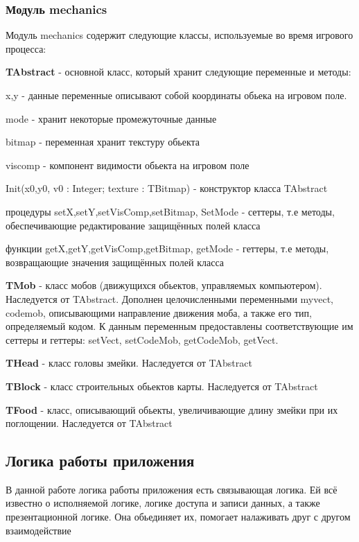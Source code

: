 \documentclass[a4paper,14pt]{extarticle}
\begin{document}
\subsubsection{Модуль mechanics}
Модуль mechanics содержит следующие классы, используемые во время игрового процесса:

\textbf{TAbstract} - основной класс, который хранит следующие переменные и методы:

 x,y - данные переменные описывают собой координаты обьека на игровом поле. 

 mode - хранит некоторые промежуточные данные

 bitmap - переменная хранит текстуру обьекта

 viscomp - компонент видимости обьекта на игровом поле

 Init(x0,y0, v0 : Integer; texture : TBitmap) - конструктор класса TAbstract

 процедуры setX,setY,setVisComp,setBitmap, SetMode - сеттеры, т.е методы, обеспечивающие редактирование защищённых полей класса

 функции getX,getY,getVisComp,getBitmap, getMode - геттеры, т.е методы, возвращающие значения защищённых полей класса

\textbf{TMob} - класс мобов (движущихся обьектов, управляемых компьютером). Наследуется от TAbstract. Дополнен целочисленными переменными myvect, codemob, описывающими направление движения моба, а также его тип, определяемый кодом. К данным переменным предоставлены соответствующие им сеттеры и геттеры: setVect, setCodeMob, getCodeMob, getVect.

\textbf{THead} - класс головы змейки. Наследуется от TAbstract

\textbf{TBlock} - класс строительных обьектов карты. Наследуется от TAbstract

\textbf{TFood} - класс, описывающий обьекты, увеличивающие длину змейки при их поглощении. Наследуется от TAbstract

\subsection{Логика работы приложения}
В данной работе логика работы приложения есть связывающая логика. Ей всё известно о исполняемой логике, логике доступа и записи данных, а также презентационной логике. Она обьединяет их, помогает налаживать друг с другом взаимодействие
\end{document}
